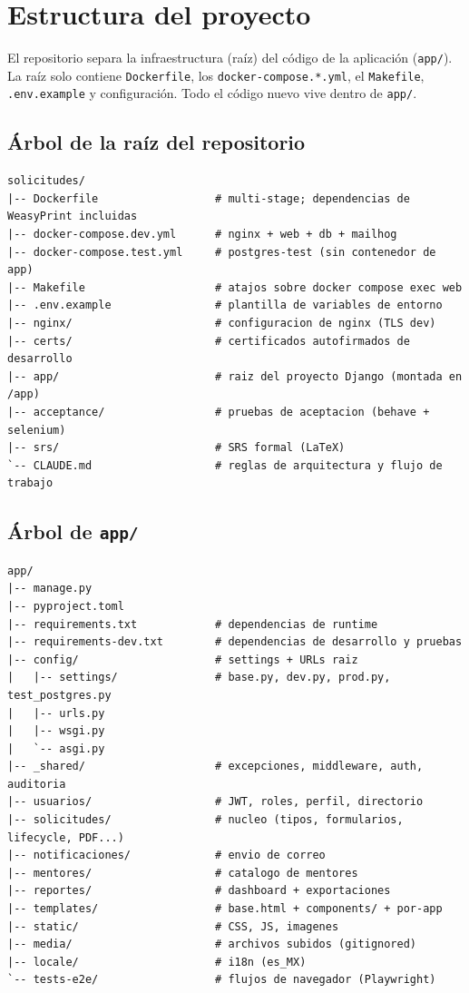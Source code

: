 \documentclass[12pt,letterpaper]{report}
\begin{document}
\chapter{Estructura del proyecto}

El repositorio separa la infraestructura (raíz) del código de la aplicación
(\texttt{app/}). La raíz solo contiene \texttt{Dockerfile}, los
\texttt{docker-compose.*.yml}, el \texttt{Makefile}, \texttt{.env.example} y
configuración. Todo el código nuevo vive dentro de \texttt{app/}.

\section{Árbol de la raíz del repositorio}

\begin{lstlisting}
solicitudes/
|-- Dockerfile                  # multi-stage; dependencias de WeasyPrint incluidas
|-- docker-compose.dev.yml      # nginx + web + db + mailhog
|-- docker-compose.test.yml     # postgres-test (sin contenedor de app)
|-- Makefile                    # atajos sobre docker compose exec web
|-- .env.example                # plantilla de variables de entorno
|-- nginx/                      # configuracion de nginx (TLS dev)
|-- certs/                      # certificados autofirmados de desarrollo
|-- app/                        # raiz del proyecto Django (montada en /app)
|-- acceptance/                 # pruebas de aceptacion (behave + selenium)
|-- srs/                        # SRS formal (LaTeX)
`-- CLAUDE.md                   # reglas de arquitectura y flujo de trabajo
\end{lstlisting}

\section{Árbol de \texttt{app/}}

\begin{lstlisting}
app/
|-- manage.py
|-- pyproject.toml
|-- requirements.txt            # dependencias de runtime
|-- requirements-dev.txt        # dependencias de desarrollo y pruebas
|-- config/                     # settings + URLs raiz
|   |-- settings/               # base.py, dev.py, prod.py, test_postgres.py
|   |-- urls.py
|   |-- wsgi.py
|   `-- asgi.py
|-- _shared/                    # excepciones, middleware, auth, auditoria
|-- usuarios/                   # JWT, roles, perfil, directorio
|-- solicitudes/                # nucleo (tipos, formularios, lifecycle, PDF...)
|-- notificaciones/             # envio de correo
|-- mentores/                   # catalogo de mentores
|-- reportes/                   # dashboard + exportaciones
|-- templates/                  # base.html + components/ + por-app
|-- static/                     # CSS, JS, imagenes
|-- media/                      # archivos subidos (gitignored)
|-- locale/                     # i18n (es_MX)
`-- tests-e2e/                  # flujos de navegador (Playwright)
\end{lstlisting}
\end{document}
